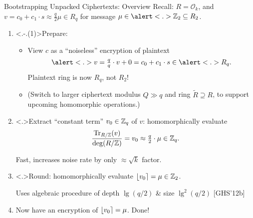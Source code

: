 \documentclass[shadow,xcolor=pdftex,svgnames,table,t]{beamer}
\DeclareMathOperator{\trace}{Tr}
\renewcommand{\O}{\mathcal{O}}
\begin{document}
\begin{frame}[label=unpacked]{Bootstrapping Unpacked Ciphertexts: Overview}
  \onslide<+-> Recall: $R=\O_{k}$, and $v = c_{0} + c_{1} \cdot s
  \approx \tfrac{q}{2} \mu \in R_{q}$ for message $\mu \in
  \alert<.>{\Z_{2}} \subseteq R_{2}$.

  \smallskip 
  \begin{enumerate}
  \item<+-> \alert<.-.(1)>{Prepare}:
    \begin{itemize}
    \item View $c$ as a ``noiseless'' encryption of plaintext
      \[ \alert<.>{v} = \tfrac{q}{q} \cdot v + 0 = c_{0} + c_{1} \cdot
      s \in \alert<.>{R_{q}}. \]
      Plaintext ring is now $R_{q}$, not $R_{2}$!

      \onslide<+-> \medskip
    \item (Switch to larger ciphertext modulus $Q \gg q$ and ring
      $\tilde{R} \supseteq R$, to support upcoming homomorphic
      operations.)
    \end{itemize}

    \smallskip
  \item<+-> \alert<.>{Extract ``constant term''} $v_{0} \in \mathbb{Z}_q$ of
    $v$: homomorphically evaluate
    \[ \frac{\trace_{R/\Z}(v)}{\deg(R/\Z)} = v_{0} \approx
    \tfrac{q}{2} \cdot \mu \in \Zq. \]

    Fast, increases noise rate by only $\approx \sqrt{k}$ factor.

    \medskip
  \item<+-> \alert<.>{Round}: homomorphically evaluate
    $\lfloor v_{0}\rceil = \mu \in \mathbb{Z}_{2}$.

    \medskip Uses algebraic procedure of depth $\lg(q/2)$ \& size
    $\lg^{2}(q/2)$ {\footnotesize [GHS'12b]}

    \smallskip
  \item<+->[$\star\star$] Now have an encryption of $\lfloor v_{0}\rceil =
    \mu$. Done!
  \end{enumerate}
\end{frame}
\end{document}

